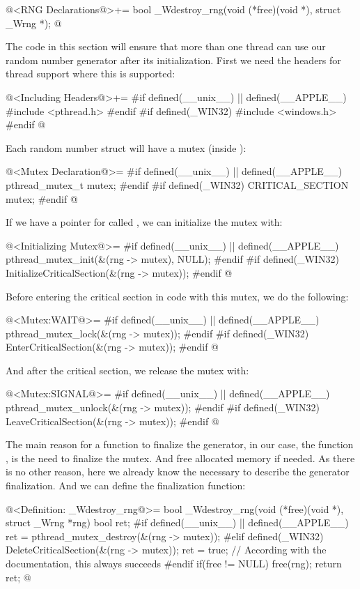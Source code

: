 \iniciocodigo
@<RNG Declarations@>+=
bool _Wdestroy_rng(void (*free)(void *), struct _Wrng *);
@
\fimcodigo


The code in this section will ensure that more than one thread can use
our random number generator after its initialization. First we need
the headers for thread support where this is supported:

\iniciocodigo
@<Including Headers@>+=
#if defined(__unix__) || defined(__APPLE__)
#include <pthread.h>
#endif
#if defined(_WIN32)
#include <windows.h>
#endif
@
\fimcodigo

Each random number struct will have a mutex
(inside ):


\iniciocodigo
@<Mutex Declaration@>=
#if defined(__unix__) || defined(__APPLE__)
pthread_mutex_t mutex;
#endif
#if defined(_WIN32)
CRITICAL_SECTION mutex;
#endif
@
\fimcodigo

If we have a pointer for 
 called , we can initialize the mutex with:

\iniciocodigo
@<Initializing Mutex@>=
#if defined(__unix__) || defined(__APPLE__)
pthread_mutex_init(&(rng -> mutex), NULL);
#endif
#if defined(_WIN32)
InitializeCriticalSection(&(rng -> mutex));
#endif
@
\fimcodigo

Before entering the critical section in code with this mutex, we do
the following:

\iniciocodigo
@<Mutex:WAIT@>=
#if defined(__unix__) || defined(__APPLE__)
pthread_mutex_lock(&(rng -> mutex));
#endif
#if defined(_WIN32)
EnterCriticalSection(&(rng -> mutex));
#endif
@
\fimcodigo

And after the critical section, we release the mutex with:

\iniciocodigo
@<Mutex:SIGNAL@>=
#if defined(__unix__) || defined(__APPLE__)
pthread_mutex_unlock(&(rng -> mutex));
#endif
#if defined(_WIN32)
LeaveCriticalSection(&(rng -> mutex));
#endif
@
\fimcodigo

The main reason for a function to finalize the generator, in our case,
the function , is the need to finalize the
mutex. And free allocated memory if needed. As there is no other
reason, here we already know the necessary to describe the generator
finalization. And we can define the finalization function:

\iniciocodigo
@<Definition: \_Wdestroy\_rng@>=
bool _Wdestroy_rng(void (*free)(void *), struct _Wrng *rng){
  bool ret;
#if defined(__unix__) || defined(__APPLE__)
  ret = pthread_mutex_destroy(&(rng -> mutex));
#elif defined(_WIN32)
  DeleteCriticalSection(&(rng -> mutex));
  ret = true; // According with the documentation, this always succeeds
#endif
  if(free != NULL)
    free(rng);
  return ret;
}
@
\fimcodigo


